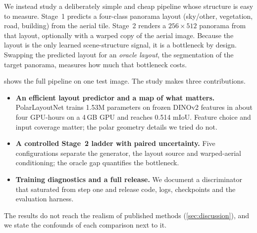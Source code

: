 \documentclass[11pt]{article}
\begin{document}
We instead study a deliberately simple and cheap pipeline whose structure is easy to measure. Stage~1 predicts
a four-class panorama layout (sky/other, vegetation, road, building) from the aerial tile. Stage~2 renders a
$256\times512$ panorama from that layout, optionally with a warped copy of the aerial image. Because the
layout is the only learned scene-structure signal, it is a bottleneck by design. Swapping the predicted
layout for an \emph{oracle layout}, the segmentation of the target panorama, measures how much that
bottleneck costs.

 shows the full pipeline on one test image. The study makes three contributions.
\begin{itemize}
  \item \textbf{An efficient layout predictor and a map of what matters.} PolarLayoutNet trains
  1.53M parameters on frozen DINOv2 features \cite{oquab2023dinov2} in about four GPU-hours on a 4\,GB GPU and
  reaches 0.514 mIoU. Feature choice and input coverage matter; the polar geometry details we tried do not.
  \item \textbf{A controlled Stage~2 ladder with paired uncertainty.} Five configurations separate the
  generator, the layout source and warped-aerial conditioning; the oracle gap quantifies the bottleneck.
  \item \textbf{Training diagnostics and a full release.} We document a discriminator that saturated from
  step one and release code, logs, checkpoints and the evaluation harness.
\end{itemize}
The results do not reach the realism of published methods (\cref{sec:discussion}), and we state the
confounds of each comparison next to it.
\end{document}
